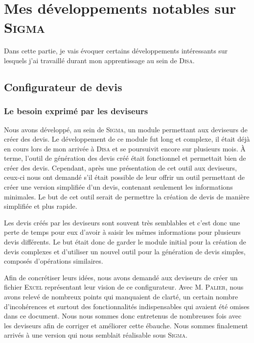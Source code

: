\section{Mes développements notables sur \textsc{Sigma}}

Dans cette partie, je vais évoquer certains développements intéressants sur lesquels j'ai travaillé durant mon apprentissage au sein de \textsc{Disa}.

\subsection{Configurateur de devis}

\subsubsection{Le besoin exprimé par les deviseurs}

Nous avons développé, au sein de \textsc{Sigma}, un module permettant aux deviseurs de créer des devis.
Le développement de ce module fut long et complexe, il était déjà en cours lors de mon arrivée à \textsc{Disa} et se poursuivit encore sur plusieurs mois.
À terme, l'outil de génération des devis créé était fonctionnel et permettait bien de créer des devis.
Cependant, après une présentation de cet outil aux deviseurs, ceux-ci nous ont demandé s'il était possible de leur offrir un outil permettant de créer une version simplifiée d'un devis, contenant seulement les informations minimales.
Le but de cet outil serait de permettre la création de devis de manière simplifiée et plus rapide.

Les devis créés par les deviseurs sont souvent très semblables et c'est donc une perte de temps pour eux d'avoir à saisir les mêmes informations pour plusieurs devis différents.
Le but était donc de garder le module initial pour la création de devis complexes et d'utiliser un nouvel outil pour la génération de devis simples, composés d'opérations similaires.

Afin de concrétiser leurs idées, nous avons demandé aux deviseurs de créer un fichier \textsc{Excel} représentant leur vision de ce configurateur.
Avec M. \textsc{Palier}, nous avons relevé de nombreux points qui manquaient de clarté, un certain nombre d'incohérences et surtout des fonctionnalités indispensables qui avaient été omises dans ce document.
Nous nous sommes donc entretenus de nombreuses fois avec les deviseurs afin de corriger et améliorer cette ébauche.
Nous sommes finalement arrivés à une version qui nous semblait réalisable sous \textsc{Sigma}.


